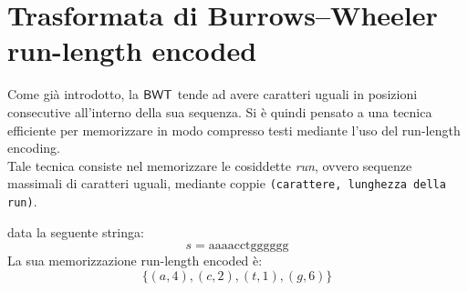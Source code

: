 \section{Trasformata di Burrows--Wheeler run-length encoded}
Come già introdotto, la $\mbox{\rm {\sf BWT}}$ tende ad avere caratteri uguali in
posizioni consecutive all'interno della sua sequenza. Si è quindi 
pensato a una tecnica efficiente per memorizzare in modo compresso
testi mediante l'uso del run-length encoding. \\
Tale tecnica consiste nel
memorizzare le cosiddette \textit{run}, ovvero sequenze massimali di caratteri
uguali, mediante coppie \texttt{(carattere, lunghezza della run)}.
\begin{esempio}
  data la seguente stringa:
  \[s=\mbox{aaaacctgggggg}\]
  La sua memorizzazione run-length encoded è:
  \[\{(a,4),(c,2),(t,1),(g,6)\}\]
\end{esempio}
